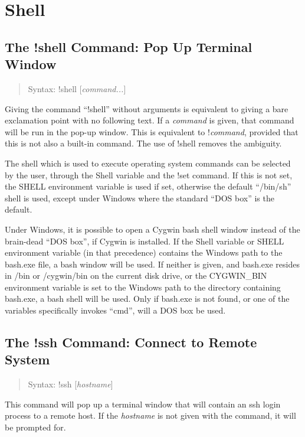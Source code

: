 \section{Shell}

\subsection{The {\cb !shell} Command: Pop Up Terminal Window}
\label{shellcmd}
\begin{quote}
Syntax: {\vt !shell} [{\it command...\/}]
\end{quote}
Giving the command ``{\cb !shell}'' without arguments is equivalent to
giving a bare exclamation point with no following text.  If a {\it
command} is given, that command will be run in the pop-up window. 
This is equivalent to {\vt !}{\it command}, provided that this is not
also a built-in command.  The use of {\vt !shell} removes the
ambiguity.

The shell which is used to execute operating system commands can be
selected by the user, through the {\et Shell} variable and the {\cb
!set} command.  If this is not set, the {\et SHELL} environment
variable is used if set, otherwise the default ``{\vt /bin/sh}'' shell
is used, except under Windows where the standard ``DOS box'' is the
default.

Under Windows, it is possible to open a Cygwin {\vt bash} shell window
instead of the brain-dead ``DOS box'', if Cygwin is installed.  If the
{\et Shell} variable or {\et SHELL} environment variable (in that
precedence) contains the Windows path to the {\vt bash.exe} file, a
bash window will be used.  If neither is given, and {\vt bash.exe}
resides in {\vt /bin} or {\vt /cygwin/bin} on the current disk drive,
or the {\vt CYGWIN\_BIN} environment variable is set to the Windows
path to the directory containing {\vt bash.exe}, a bash shell will be
used.  Only if {\vt bash.exe} is not found, or one of the variables
specifically invokes ``{\vt cmd}'', will a DOS box be used.


\subsection{The {\cb !ssh} Command: Connect to Remote System}
\begin{quote}
Syntax: {\vt !ssh} [{\it hostname\/}]
\end{quote}
This command will pop up a terminal window that will contain an {\vt
ssh} login process to a remote host.  If the {\it hostname} is not
given with the command, it will be prompted for.
 
